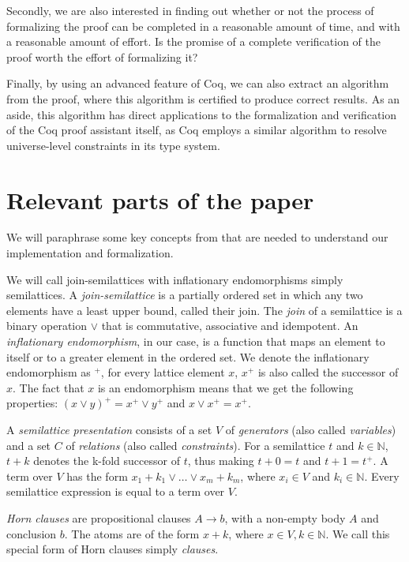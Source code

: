 Secondly, we are also interested in finding out whether or not the process of formalizing the proof
can be completed in a reasonable amount of time, and with a reasonable amount of effort.
Is the promise of a complete verification of the proof worth the effort of formalizing it?

Finally, by using an advanced feature of Coq, we can also extract an algorithm from the proof,
where this algorithm is certified to produce correct results.
As an aside, this algorithm has direct applications to the formalization and verification of the Coq proof assistant itself,
as Coq employs a similar algorithm to resolve universe-level constraints in its type system.

\section{Relevant parts of the paper}
\label{sec:relevant_parts_of_the_paper}

We will paraphrase some key concepts from \cite{mbezem} that are needed to understand
our implementation and formalization.

We will call join-semilattices with inflationary endomorphisms simply semilattices.
A \emph{join-semilattice} is a partially ordered set in which any two elements have a least upper bound,
called their join.
The \emph{join} of a semilattice is a binary operation $\lor$ that is commutative, associative and idempotent.
An \emph{inflationary endomorphism}, in our case, is a function
that maps an element to itself or to a greater element in the ordered set.
We denote the inflationary endomorphism as $^+$, for every lattice element $x$,
$x^+$ is also called the successor of $x$.
The fact that $x$ is an endomorphism means that we get the following properties:
$(x \lor y)^+ = x^+ \lor y^+$ and $x \lor x^+ = x^+$.


A \emph{semilattice presentation} consists of a set $V$ of \emph{generators}
(also called \emph{variables}) and a set $C$ of \emph{relations}
(also called \emph{constraints}).
For a semilattice $t$ and $k \in \mathbb{N}$, $t + k$ denotes the k-fold successor of $t$, thus making $t + 0 = t$ and $t + 1 = t^+$.
A term over $V$ has the form $x_1 + k_1 \lor \ldots \lor x_m + k_m$, where $x_i \in V$ and $k_i \in \mathbb{N}$.
Every semilattice expression is equal to a term over $V$.

\emph{Horn clauses} are propositional clauses $A \rightarrow b$, with a non-empty body $A$ and conclusion $b$.
The atoms are of the form $x + k$, where $x \in V, k \in \mathbb{N}$.
We call this special form of Horn clauses simply \emph{clauses}.

